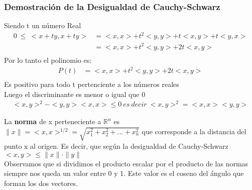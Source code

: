 \documentclass[11pt]{article}
\newcommand{\R}{\mathbb{R}}
\theoremstyle{plain}
\begin{document}
            \subsubsection{Demostración de la Desigualdad de Cauchy-Schwarz} %
            \label{subsub:demostración_de_la_desigualdad_de_cauchy_schwarz}
                Siendo t un número Real
                \begin{equation}
                    \begin{aligned}
                            0 \ \le \ <x+ty, x +ty> & = <x,x> + t^2 <y,y> + t<x,y> + t<y,x>\\
                           & = <x,x> + t^2<y,y> + 2t<x,y>\\
                    \end{aligned}
                \end{equation}
                Por lo tanto el polinomio es:
                \begin{equation}
                    \begin{aligned}
                            P(t) & = <x,x> + t^2<y,y> + 2t<x,y>\\
                    \end{aligned}
                \end{equation}
                Es positivo para todo t pertenciente a los números reales\\
                Luego el discriminante es menor o igual que 0
                \begin{equation}
                    \begin{aligned}
                            <x,y>^2 - <y,y> <x,x> \le 0 \  es\ decir\ <x,y>^2 = <x,x><y,y>
                    \end{aligned}
                \end{equation}

            La \textbf{norma} de x perteneciente a $\R ^n$ es $\|x\| = <x,x> ^{1/2} = \sqrt{x_1^2+x_2^2+...+x_n^2}$  que corresponde a la distancia del punto x al origen.
            Es decir, que según la desigualdad de Cauchy-Schwarz $<x,y> \le \|x\| \cdot \|y\|$ \\

            Observamos que si dividimos el producto escalar por el producto de las normas siempre nos queda un valor entre 0 y 1. Este valor es el coseno del ángulo que forman los dos vectores.
\end{document}
